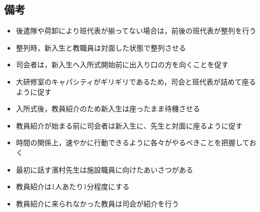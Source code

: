 \subsection{備考}
\begin{itemize}
\item 後遣隊や荷卸により班代表が揃ってない場合は，前後の班代表が整列を行う
\item 整列時，新入生と教職員は対面した状態で整列させる
\item 司会者は，新入生へ入所式開始前に出入り口の方を向くことを促す
\item 大研修室のキャパシティがギリギリであるため，司会と班代表が詰めて座るように促す
\item 入所式後，教員紹介のため新入生は座ったまま待機させる
\item 教員紹介が始まる前に司会者は新入生に、先生と対面に座るように促す
\item 時間の関係上，速やかに行動できるように各々がやるべきことを把握しておく
\item 最初に話す濱村先生は施設職員に向けたあいさつがある
\item 教員紹介は1人あたり1分程度にする
\item 教員紹介に来られなかった教員は司会が紹介を行う
\end{itemize}



%

